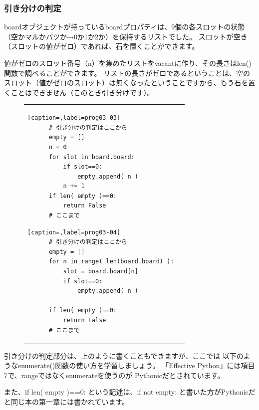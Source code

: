 \documentclass[uplatex,a4paper,11pt,oneside,openany]{jsbook}
\begin{document}
\subsubsection{引き分けの判定}

boardオブジェクトが持っているboardプロパティは、9個の各スロットの状態（空かマルかバツか→0か1か2か）を保持するリストでした。
スロットが空き（スロットの値がゼロ）であれば、石を置くことができます。

値がゼロのスロット番号（n）を集めたリストをvacantに作り、その長さはlen()関数で調べることができます。
リストの長さがゼロであるということは、空のスロット（値がゼロのスロット）は無くなったということですから、もう石を置くことはできません（このとき引き分けです）。

\begin{figure}[H]
  \centering
  \begin{tabular}{ll}
      \begin{minipage}{0.5\hsize}
      \centering
      \begin{lstlisting}[caption=,label=prog03-03]
      # 引き分けの判定はここから
      empty = []
      n = 0
      for slot in board.board:
          if slot==0:
              empty.append( n )
          n += 1
      if len( empty )==0:
          return False
      # ここまで
      \end{lstlisting}%
      \end{minipage}
      \begin{minipage}{0.5\hsize}
      \flushright
      \begin{lstlisting}[caption=,label=prog03-04]
      # 引き分けの判定はここから
      empty = []
      for n in range( len(board.board) ):
          slot = board.board[n]
          if slot==0:
              empty.append( n )

      if len( empty )==0:
          return False
      # ここまで
      \end{lstlisting}%
      \end{minipage}
    \end{tabular}
\end{figure}%

引き分けの判定部分は、上のように書くこともできますが、ここでは
以下のようなenumerate()関数の使い方を学習しましょう。
「Effective Python」には項目7で、rangeではなくenumerateを使うのが
Pythonicだとされています。

また、if len( empty )==0: という記述は、if not empty: と書いた方がPythonicだと同じ本の第一章には書かれています。
\end{document}

